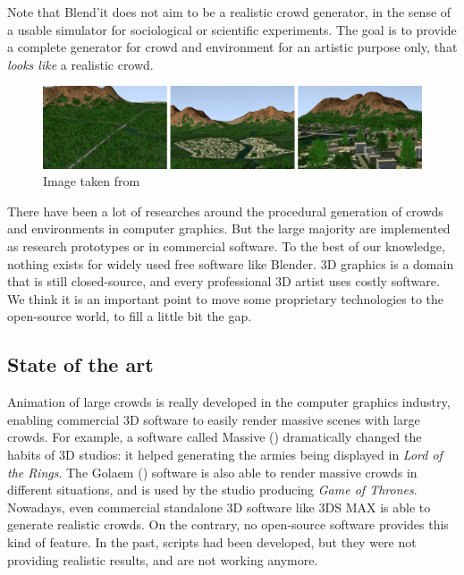 Note that Blend'it does not aim to be a realistic crowd generator, in
the sense of a usable simulator for sociological or scientific
experiments. The goal is to provide a complete generator for crowd and
environment for an artistic purpose only, that \textit{looks like} a
realistic crowd.

\begin{figure}[h]
  \includegraphics[width=15cm]{img/env1.jpg}
  \caption{Image taken from \cite{DeclarativeArchitecture}}
  \label{fig:env}
\end{figure}


There have been a lot of researches around the procedural generation
of crowds and environments in computer graphics. But the large
majority are implemented as research prototypes or in commercial
software. To the best of our knowledge, nothing exists for widely used
free software like Blender. 3D graphics is a domain that is still
closed-source, and every professional 3D artist uses costly
software. We think it is an important point to move some proprietary
technologies to the open-source world, to fill a little bit the gap.

\subsection{State of the art}



Animation of large crowds is really developed in the computer
graphics industry, enabling commercial 3D software to easily render
massive scenes with large crowds. For example, a software called Massive (\cite{Massive}) dramatically
changed the habits of 3D studios: it helped generating
the armies being displayed in \textit{Lord of the Rings}. The Golaem
(\cite{Golaem}) software is also able to render massive crowds in
different situations, and is used by the studio producing \textit{Game
of Thrones}. Nowadays, even commercial standalone 3D software like 3DS
MAX\cite{3dsmax} is able to generate realistic crowds. On the
contrary, no open-source software provides this kind of feature. In
the past, scripts had been developed, but they were not providing
realistic results, and are not working anymore.


